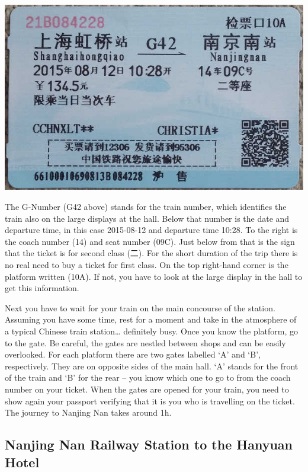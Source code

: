 \documentclass[11pt]{report}
\begin{document}
\begin{center}
\includegraphics[scale=0.3]{travel_guide/ticket.jpg}
\end{center}

\noindent The G-Number (G42 above) stands for the train
number, which identifies the train also on the large displays
at the hall. Below that number is the date and departure time,
in this case 2015-08-12 and departure time 10:28. To the right
is the coach number (14) and seat number (09C). Just below
from that is the sign that the ticket is for second class (二). 
For the short duration of the trip there is no real need
to buy a ticket for first class. On the top right-hand corner
is the platform written (10A). If not, you have to look
at the large display in the hall to get this information.

Next you have to wait for your train on the main concourse of
the station. Assuming you have some time, rest for a moment
and take in the atmosphere of a typical Chinese train
station\ldots{} definitely busy. Once you know the
platform, go to the gate. Be careful, the gates are nestled
between shops and can be easily overlooked. For each platform
there are two gates labelled `A' and `B', respectively. They
are on opposite sides of the main hall. `A' stands for the
front of the train and `B' for the rear -- you know which one
to go to from the coach number on your ticket. When the gates
are opened for your train, you need to show again your passport
verifying that it is you who is travelling on the ticket. The
journey to Nanjing Nan takes around 1h.

\subsection*{Nanjing Nan Railway Station to the Hanyuan Hotel}
\end{document}
